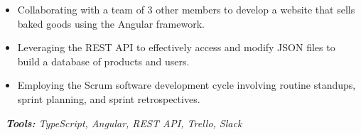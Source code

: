 \documentclass[10pt,letter]{altacv}
\begin{document}

\begin{fullwidth}
\makecvheader
\end{fullwidth}




\begin{itemize}
  \item Collaborating with a team of 3 other members to develop a website that sells baked goods using the Angular framework.
  \item Leveraging the REST API to effectively access and modify JSON files to build a database of products and users.
  \item Employing the Scrum software development cycle involving routine standups, sprint planning, and sprint retrospectives.
\end{itemize}\
\textit{\textbf{Tools:} TypeScript, Angular, REST API, Trello, Slack}
\end{document}
